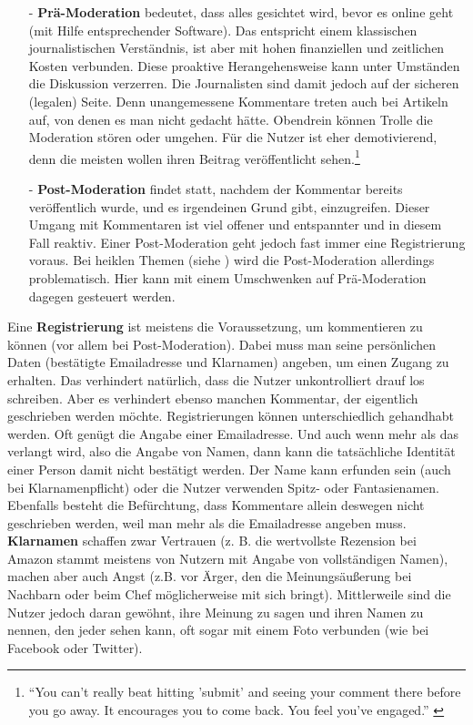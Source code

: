 \begin{itemize}
  \item[-] {\bfseries Prä-Moderation}
    bedeutet, dass alles gesichtet wird, bevor es online geht (mit Hilfe
    entsprechender Software). Das entspricht einem klassischen journalistischen
    Verständnis, ist aber mit hohen finanziellen und zeitlichen Kosten
    verbunden.  Diese \glqq proaktive\grqq{} Herangehensweise
    \autocite[S.~108]{reich} kann unter Umständen die Diskussion verzerren. Die
    Journalisten sind damit jedoch auf der sicheren (legalen) Seite. Denn
    unangemessene Kommentare treten auch bei Artikeln auf, von denen es man
    nicht gedacht hätte. Obendrein können \glqq Trolle\grqq{} die Moderation
    stören oder umgehen. Für die Nutzer ist eher demotivierend, denn die meisten
    wollen ihren Beitrag veröffentlicht sehen.\footnote{``You can't really beat
    hitting 'submit' and seeing your comment there before you go away. It
    encourages you to come back. You feel you've engaged.''
    \autocite[S.~109]{reich}}

  \item[-] {\bfseries Post-Moderation}
    findet statt, nachdem der Kommentar bereits veröffentlich wurde, und es
    irgendeinen Grund gibt, einzugreifen. Dieser Umgang mit Kommentaren ist viel
    offener und entspannter und in diesem Fall \glqq reaktiv\grqq. Einer
    Post-Moderation geht jedoch fast immer eine Registrierung voraus. Bei
    heiklen Themen (siehe
    )
    wird die Post-Moderation allerdings problematisch. Hier kann mit einem
    Umschwenken auf Prä-Moderation dagegen gesteuert werden.
\end{itemize}

Eine {\bfseries Registrierung} ist meistens die Voraussetzung, um kommentieren
zu können (vor allem bei Post-Moderation). Dabei muss man seine persönlichen
Daten (be\-stä\-tig\-te Emailadresse und Klarnamen) angeben, um einen Zugang zu
erhalten. Das verhindert natürlich, dass die Nutzer unkontrolliert drauf los
schreiben. Aber es verhindert ebenso manchen Kommentar, der eigentlich
geschrieben werden möchte. Registrierungen können unterschiedlich gehandhabt
werden. Oft genügt die Angabe einer Emailadresse. Und auch wenn mehr als das
verlangt wird, also die Angabe von Namen, dann kann die tatsächliche Identität
einer Person damit nicht bestätigt werden. Der Name kann erfunden sein (auch bei
Klarnamenpflicht) oder die Nutzer verwenden Spitz- oder Fantasienamen. Ebenfalls
besteht die Befürchtung, dass Kommentare allein deswegen nicht geschrieben
werden, weil man mehr als die Emailadresse angeben muss.  {\bfseries Klarnamen}
schaffen zwar Vertrauen (z. B. die wertvollste Rezension bei Amazon stammt
meistens von Nutzern mit Angabe von vollständigen Namen), machen aber auch Angst
(z.B. vor Ärger, den die Meinungsäußerung bei Nachbarn oder beim Chef
möglicherweise mit sich bringt). Mittlerweile sind die Nutzer jedoch daran
gewöhnt, ihre Meinung zu sagen und ihren Namen zu nennen, den jeder sehen kann,
oft sogar mit einem Foto verbunden (wie bei Facebook oder Twitter).



